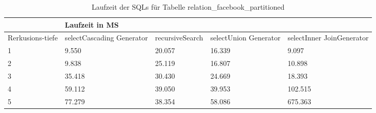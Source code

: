 \begin{table}[H]
	\centering
	\begin{tabular}{l|l|l|l|l|l|}
		\cline{2-6}
		& \multicolumn{5}{|l|}{Laufzeit in MS}                                                                                                                                                  \\ \hline
		\multicolumn{1}{|l|}{\multirow{2}{2cm}{Rerkusions-tiefe}} & \multicolumn{2}{|l|}{\multirow{2}{3cm}{selectCascading Generator}} & \multirow{2}{2.8cm}{recursiveSearch} & \multirow{2}{2.5cm}{selectUnion Generator} & \multirow{2}{2.5cm}{selectInner JoinGenerator} \\
		\multicolumn{1}{|l|}{}
		& \multicolumn{2}{|l|}{}                                           &                                  &                                     &                                           \\ \hline
		
\multicolumn{1}{|l|}{1}                                 & \multicolumn{2}{l|}{9.550}                                       & 20.057                                                & 16.339                                                    & 9.097                                                           \\ \hline
\multicolumn{1}{|l|}{2}                                 & \multicolumn{2}{l|}{9.838}                                       & 25.119                                                & 16.807                                                    & 10.898                                                          \\ \hline
\multicolumn{1}{|l|}{3}                                 & \multicolumn{2}{l|}{35.418}                                      & 30.430                                                & 24.669                                                    & 18.393                                                          \\ \hline
\multicolumn{1}{|l|}{4}                                 & \multicolumn{2}{l|}{59.112}                                      & 39.050                                                & 39.953                                                    & 102.515                                                         \\ \hline
\multicolumn{1}{|l|}{5}                                 & \multicolumn{2}{l|}{77.279}                                      & 38.354                                                & 58.086                                                    & 675.363                                                         \\ \hline

		
		
	\end{tabular}
	\caption{Laufzeit der SQLs für Tabelle relation\_facebook\_partitioned}
	\label{2.relationfacebookpartion.table}
\end{table}

